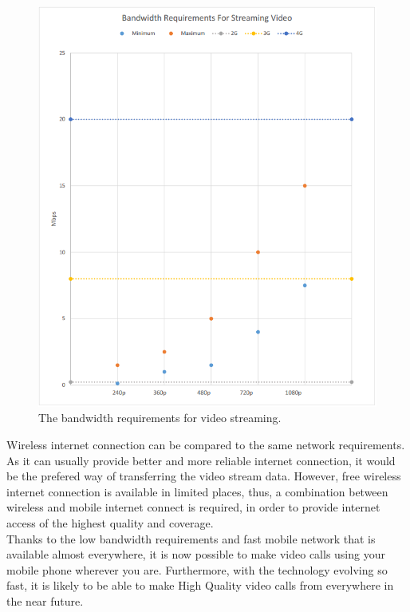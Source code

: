 \documentclass{article}
\begin{document}
\begin{figure}[H]
		\centering
		\includegraphics[width=1\textwidth]{"SDS Video Bandwidth"}
		\caption{The bandwidth requirements for video streaming.}
	\end{figure}
	
	Wireless internet connection can be compared to the same network requirements. As it can usually provide better and more reliable internet connection, it would be the prefered way of transferring the video stream data. However, free wireless internet connection is available in limited places, thus, a combination between wireless and mobile internet connect is required, in order to provide internet access of the highest quality and coverage.\\

Thanks to the low bandwidth requirements and fast mobile network that is available almost everywhere, it is now possible to make video calls using your mobile phone wherever you are. Furthermore, with the technology evolving so fast, it is likely to be able to make High Quality video calls from everywhere in the near future.\\
\end{document}
